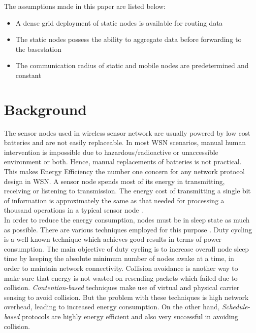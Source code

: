 \documentclass[a4paper, conference, 10pt]{IEEEtran}
\begin{document}
The assumptions made in this paper are listed below:
\begin{itemize}
	\item A dense grid deployment of static nodes is available for routing data
	\item The static nodes possess the ability to aggregate data before forwarding to the basestation
	\item The communication radius of static and mobile nodes are predetermined and constant
\end{itemize}


\section{Background}
\label{bg}
The sensor nodes used in wireless sensor network are usually powered by low cost batteries and are not easily replaceable. In most WSN scenarios, manual human intervention is impossible due to hazardous/radioactive or unaccessible environment or both. Hence, manual replacements of batteries is not practical. This makes Energy Efficiency the number one concern for any network protocol design in WSN. A sensor node spends most of its energy in transmitting, receiving or listening to transmission. The energy cost of transmitting a single bit of information is approximately the same as that needed for processing a thousand operations in a typical sensor node \cite{eeff_q}. \\

In order to reduce the energy consumption, nodes must be in sleep state as much as possible. There are various techniques employed for this purpose \cite{eeff_tech}. Duty cycling is a well-known technique which achieves good results in terms of power consumption. The main objective of duty cycling is to increase overall node sleep time by keeping the absolute minimum number of nodes awake at a time, in order to maintain network connectivity. Collision avoidance is another way to make sure that energy is not wasted on resending packets which failed due to collision. \emph{Contention-based} techniques make use of virtual and physical carrier sensing to avoid collision. But the problem with these techniques is high network overhead, leading to increased energy consumption. On the other hand, \emph{Schedule-based} protocols are highly energy efficient and also very successful in avoiding collision. \\
\end{document}
